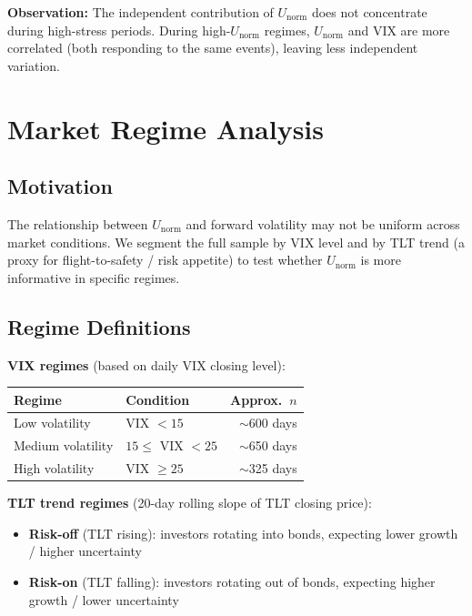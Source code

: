 \documentclass[11pt]{article}
\begin{document}
\textbf{Observation:} The independent contribution of $U_\mathrm{norm}$ does not concentrate during high-stress periods. During high-$U_\mathrm{norm}$ regimes, $U_\mathrm{norm}$ and VIX are more correlated (both responding to the same events), leaving less independent variation.

\section{Market Regime Analysis}

\subsection{Motivation}

The relationship between $U_\mathrm{norm}$ and forward volatility may not be uniform across market conditions. We segment the full sample by VIX level and by TLT trend (a proxy for flight-to-safety / risk appetite) to test whether $U_\mathrm{norm}$ is more informative in specific regimes.

\subsection{Regime Definitions}

\textbf{VIX regimes} (based on daily VIX closing level):
\begin{table}[htbp]
\centering
\begin{tabular}{llr}
\toprule
Regime & Condition & Approx.\ $n$ \\
\midrule
Low volatility    & VIX $< 15$  & $\sim$600 days \\
Medium volatility & $15 \leq$ VIX $< 25$ & $\sim$650 days \\
High volatility   & VIX $\geq 25$ & $\sim$325 days \\
\bottomrule
\end{tabular}
\end{table}

\textbf{TLT trend regimes} (20-day rolling slope of TLT closing price):
\begin{itemize}
    \item \textbf{Risk-off} (TLT rising): investors rotating into bonds, expecting lower growth / higher uncertainty
    \item \textbf{Risk-on} (TLT falling): investors rotating out of bonds, expecting higher growth / lower uncertainty
\end{itemize}
\end{document}
